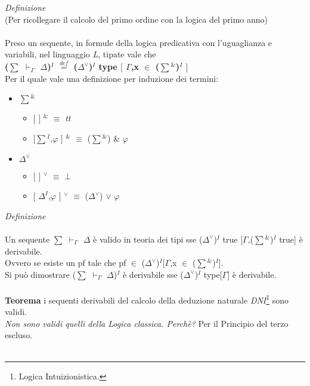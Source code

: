 \noindent \textit{Definizione}\\
(Per ricollegare il calcolo del primo ordine con la logica del primo anno)\\\\
\noindent 
Preso un sequente, in formule della logica predicativa con l'uguaglianza  e variabili, nel linguaggio \textit{L}, tipate vale che\\
\textbf{({\scriptsize$\sum$} $\vdash_\Gamma$ $\Delta$)$^I$ ${\overset{\mathit{def}}{=}}$ ($\Delta^\vee$)$^I$ type $[$ $\Gamma$,x $\in$ ({\scriptsize$\sum$}$^\&$)$^I$ $]$}\\
Per il quale vale una definizione per induzione dei termini:
\begin{itemize}
\item {\scriptsize$\sum$}$^\&$
\begin{itemize}
\item $[$ $]$ $^\&$ $\equiv$ \textit{tt}
\item $[${\scriptsize$\sum$}$^I$,$\varphi$ $]$ $^\&$ $\equiv$ ({\scriptsize$\sum$}$^\&$) \& $\varphi$
\end{itemize}
\item $\Delta^\vee$
\begin{itemize}
\item $[$ $]$ $^\vee$ $\equiv$ \textit{$\bot$}
\item $[$ $\Delta^I$,$\varphi$ $]$ $^\vee$ $\equiv$ ($\Delta^\vee$) $\vee$ $\varphi$
\end{itemize}
\end{itemize}
\noindent
\newpage
\noindent \textit{Definizione}\\\\
\noindent Un sequente {\scriptsize$\sum$} $\vdash_\Gamma$ $\Delta$ \`e valido in teoria dei tipi sse ($\Delta^\vee$)$^I$ true [$\Gamma$,({\scriptsize$\sum$}$^\&$)$^I$ true] \`e derivabile.\\
Ovvero se esiste un pf tale che pf $\in$ ($\Delta^\vee$)$^I$[$\Gamma$,x $\in$ ({\scriptsize$\sum$}$^\&$)$^I$].\\
Si pu\`o dimostrare ({\scriptsize$\sum$} $\vdash_\Gamma$ $\Delta$)$^I$ \`e derivabile sse ($\Delta^\vee$)$^I$ type[$\Gamma$] \`e derivabile.
\\\\
\noindent
\textbf{Teorema} i sequenti derivabili del calcolo della deduzione naturale \textit{DNI}\footnote{Logica Intuizionistica.} sono validi.\\
\textit{Non sono validi quelli della Logica classica. Perch\`e?} Per il Principio del terzo escluso.\\\\
